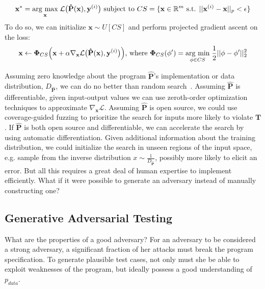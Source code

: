 %
\begin{equation}
\mathbf{x}^* = \underset{\mathbf{x}}{\operatorname{arg}\,\operatorname{max}}\;\mathcal{L}\big(\mathbf{\hat P}(\mathbf{x}), \mathbf{y}^{(i)}\big) \text{ subject to } CS = \{\mathbf{x} \in \mathbb{R}^m \text{ s.t. } ||\mathbf{x}^{(i)} - \mathbf{x}||_p    < \epsilon\}
\end{equation}
%
To do so, we can initialize $\mathbf{x} \sim U[CS]$ and perform projected gradient ascent on the loss:
%
\begin{equation}\label{eq:projected_gd}
\mathbf x \leftarrow \bm\Phi_{CS}\Big(\mathbf x + \alpha\mathbf\nabla_{\mathbf x} \mathcal{L}\big(\mathbf{\hat P}(\mathbf{x}), \mathbf{y}^{(i)}\big)\Big) \text{, where }
\bm\Phi_{CS}(\mathbf \phi') = \underset{\mathbf \phi \in CS}{\operatorname{arg}\,\operatorname{min}}\;\frac{1}{2}||\mathbf \phi - \mathbf \phi'||^2_2
\end{equation}
%

Assuming zero knowledge about the program $\mathbf{\hat P}$'s implementation or data distribution, $D_{\mathbf{\hat P}}$, we can do no better than random search~\citep{wolpert1997no}. Assuming $\mathbf{\hat P}$ is differentiable, given input-output values we can use zeroth-order optimization techniques to approximate $\nabla_{\mathbf{x}}\mathcal{L}$. Assuming $\mathbf{\hat P}$ is open source, we could use coverage-guided fuzzing to prioritize the search for inputs more likely to violate $\mathbf T$. If $\mathbf{\hat P}$ is both open source and differentiable, we can accelerate the search by using automatic differentiation. Given additional information about the training distribution, we could initialize the search in unseen regions of the input space, e.g. sample from the inverse distribution $x \sim \frac{1}{D_{\mathbf{\hat P}}}$, possibly more likely to elicit an error. But all this requires a great deal of human expertise to implement efficiently. What if it were possible to generate an adversary instead of manually constructing one?

\subsection{Generative Adversarial Testing}

What are the properties of a good adversary? For an adversary to be considered a strong adversary, a significant fraction of her attacks must break the program specification. To generate plausible test cases, not only must she be able to exploit weaknesses of the program, but ideally possess a good understanding of $p_{data}$.

